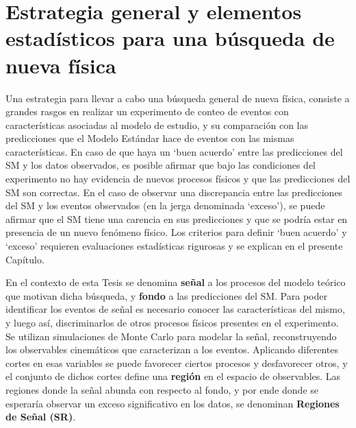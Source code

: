 \chapter{Estrategia general y elementos estadísticos para una búsqueda de nueva física}\label{cap:statistical}


Una estrategia para llevar a cabo una búsqueda general de nueva física, consiste a grandes rasgos en realizar un experimento de conteo de eventos con características asociadas al modelo de estudio, y su comparación con las predicciones que el Modelo Estándar hace de eventos con las mismas características. En caso de que haya un `buen acuerdo' entre las predicciones del SM y los datos observados, es posible afirmar que bajo las condiciones del experimento no hay evidencia de nuevos procesos físicos y que las predicciones del SM son correctas. En el caso de observar una discrepancia entre las predicciones del SM y
los eventos observados (en la jerga denominada `exceso'), se puede afirmar que el SM tiene una carencia en sus predicciones y que se podría estar en presencia de un nuevo fenómeno físico. Los criterios para definir `buen acuerdo' y `exceso' requieren evaluaciones estadísticas rigurosas y se explican en el presente Capítulo. 

En el contexto de esta Tesis se denomina \textbf{señal} a los procesos del modelo teórico que motivan dicha búsqueda, y \textbf{fondo} a las predicciones del SM. Para poder identificar los eventos de señal es necesario conocer las características del mismo, y luego así, discriminarlos de otros procesos físicos presentes en el experimento. Se utilizan simulaciones de Monte Carlo para modelar la señal, reconstruyendo los observables cinemáticos que caracterizan a los eventos. Aplicando diferentes cortes en esas variables se puede favorecer ciertos procesos y desfavorecer otros, y el conjunto de dichos cortes define una \textbf{región} en el espacio de observables. Las regiones donde la señal abunda con respecto al fondo, y por ende donde se esperaría observar un exceso significativo en los datos, se denominan \textbf{Regiones de Señal (SR)}.

